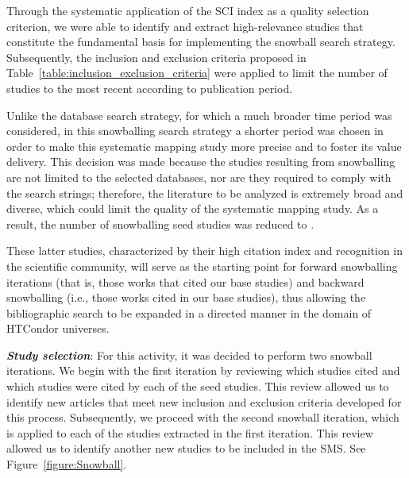 Through the systematic application of the SCI index as a quality selection criterion, we were able to identify and extract \csiSelected{} high-relevance studies that constitute the fundamental basis for implementing the snowball search strategy. Subsequently, the inclusion and exclusion criteria proposed in Table~\ref{table:inclusion_exclusion_criteria} were applied to limit the number of studies to the most recent according to publication period.

Unlike the database search strategy, for which a much broader time period was considered, in this snowballing search strategy a shorter period was chosen in order to make this systematic mapping study more precise and to foster its value delivery. This decision was made because the studies resulting from snowballing are not limited to the selected databases, nor are they required to comply with the search strings; therefore, the literature to be analyzed is extremely broad and diverse, which could limit the quality of the systematic mapping study. As a result, the number of snowballing seed studies was reduced to \newSnowballStudies{}.

These latter studies, characterized by their high citation index and recognition in the scientific community, will serve as the starting point for forward snowballing iterations (that is, those works that cited our base studies) and backward snowballing (i.e., those works cited in our base studies), thus allowing the bibliographic search to be expanded in a directed manner in the domain of HTCondor universes.

\textit{\textbf{Study selection}}: For this activity, it was decided to perform two snowball iterations. We begin with the first iteration by reviewing which studies cited and which studies were cited by each of the \newSnowballStudies{} seed studies. This review allowed us to identify \firstSnowballIterationStudies{} new articles that meet new inclusion and exclusion criteria developed for this process. Subsequently, we proceed with the second snowball iteration, which is applied to each of the \firstSnowballIterationStudies{} studies extracted in the first iteration. This review allowed us to identify another \secondSnowballIterationStudies{} new studies to be included in the SMS. See Figure~\ref{figure:Snowball}.\\



